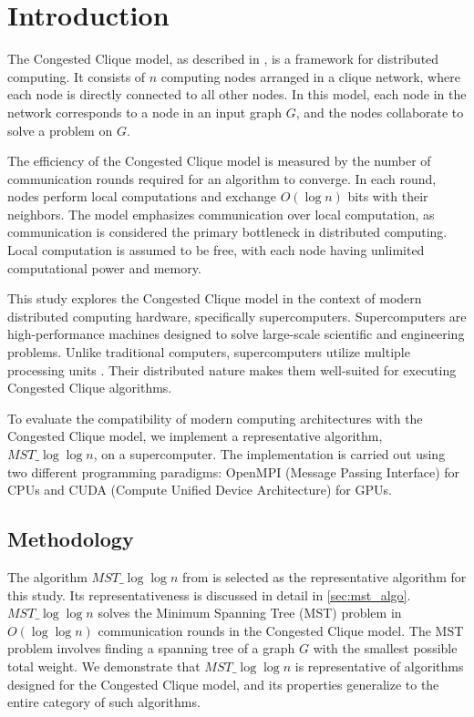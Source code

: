 \documentclass[english, 12pt, a4paper, elec, utf8, a-2b, online]{aaltothesis}
\newcommand{\mstalgo}{$MST\_\log\log{n}$}
\begin{document}
\cleardoublepage

\section{Introduction}
\label{sec:Introduction}

\thispagestyle{empty}
The Congested Clique model, as described in \cite{powerCongestClique}, is a framework for distributed computing. It consists of $n$ computing nodes arranged in a clique network, where each node is directly connected to all other nodes. In this model, each node in the network corresponds to a node in an input graph $G$, and the nodes collaborate to solve a problem on $G$.

The efficiency of the Congested Clique model is measured by the number of communication rounds required for an algorithm to converge. In each round, nodes perform local computations and exchange $O(\log{n})$ bits with their neighbors. The model emphasizes communication over local computation, as communication is considered the primary bottleneck in distributed computing. Local computation is assumed to be free, with each node having unlimited computational power and memory.

This study explores the Congested Clique model in the context of modern distributed computing hardware, specifically supercomputers. Supercomputers are high-performance machines designed to solve large-scale scientific and engineering problems. Unlike traditional computers, supercomputers utilize multiple processing units \cite{IBMsupercomputing}. Their distributed nature makes them well-suited for executing Congested Clique algorithms.

To evaluate the compatibility of modern computing architectures with the Congested Clique model, we implement a representative algorithm, \mstalgo{}, on a supercomputer. The implementation is carried out using two different programming paradigms: OpenMPI (Message Passing Interface) for CPUs and CUDA (Compute Unified Device Architecture) for GPUs.

\subsection{Methodology}
The algorithm \mstalgo{} from \cite{MSTLogLogn} is selected as the representative algorithm for this study. Its representativeness is discussed in detail in \cref{sec:mst_algo}. \mstalgo{} solves the Minimum Spanning Tree (MST) problem in $O(\log{\log{n}})$ communication rounds in the Congested Clique model. The MST problem involves finding a spanning tree of a graph $G$ with the smallest possible total weight. We demonstrate that \mstalgo{} is representative of algorithms designed for the Congested Clique model, and its properties generalize to the entire category of such algorithms.
\end{document}

